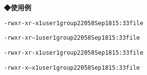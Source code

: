 \noindent
{\bf ◆使用例}
\begin{center}
\begin{breakbox}
\begin{alltt}
% \underline{ls -l file}  （←fileの詳細な情報を表示する）
-rwxr-xr-x   1 user1   group2  2058 Sep 18 15:33 file

% \underline{chmod 754 file}  （←fileのモードを754に変更）

% \underline{ls -l file}  （←fileの詳細な情報を表示する）
-rwxr-xr--   1 user1   group2  2058 Sep 18 15:33 file

% \underline{ls -l file}  （←fileの詳細な情報を表示する）
-rwxr-xr-x   1 user1   group2  2058 Sep 18 15:33 file

% \underline{chmod o-r file}  （←その他のユーザの読み込みを不許可にするにはo-rとする）

% \underline{ls -l file}  （←fileの詳細な情報を表示する）
-rwxr-x--x   1 user1   group2  2058 Sep 18 15:33 file
%
\end{alltt}
\end{breakbox}
\end{center}
\clearpage
